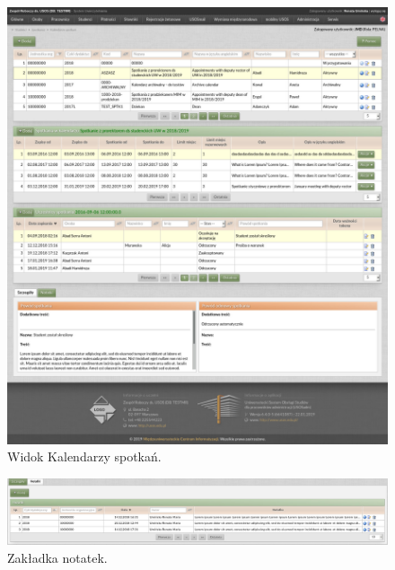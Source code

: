 \documentclass[licencjacka]{pracamgr}
\begin{document}
\begin{figure}[!]
  \includegraphics[width=\linewidth]{widok_kalendarzy.jpg}
  \caption{Widok Kalendarzy spotkań.}
  \label{fig:kalenadm}
\end{figure}

\begin{figure}[!]
  \includegraphics[width=\linewidth]{widok_kalendarzy_tabela_notatek.jpg}
  \caption{Zakładka notatek.}
  \label{fig:kalennotadm}
\end{figure}
\end{document}
